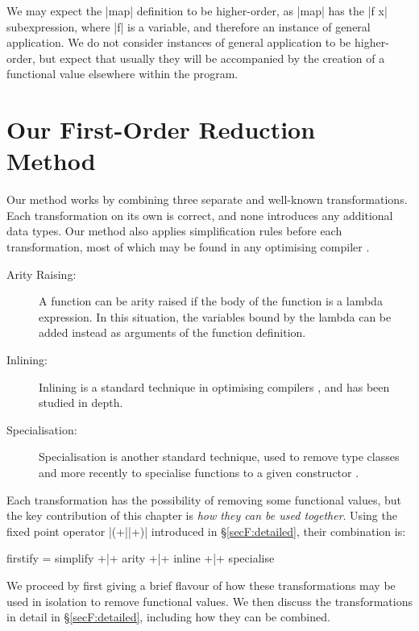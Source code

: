 We may expect the |map| definition to be higher-order, as |map| has the |f x| subexpression, where |f| is a variable, and therefore an instance of general application. We do not consider instances of general application to be higher-order, but expect that usually they will be accompanied by the creation of a functional value elsewhere within the program.

\section{Our First-Order Reduction Method}
\label{secF:overview}

Our method works by combining three separate and well-known transformations. Each transformation on its own is correct, and none introduces any additional data types. Our method also applies simplification rules before each transformation, most of which may be found in any optimising compiler \cite{spj:transformation}.

\begin{description}
\item[Arity Raising:] A function can be arity raised if the body of the function is a lambda expression. In this situation, the variables bound by the lambda can be added instead as arguments of the function definition.
\item[Inlining:] Inlining is a standard technique in optimising compilers \cite{spj:inlining}, and has been studied in depth.
\item[Specialisation:] Specialisation is another standard technique, used to remove type classes \cite{jones:dictionary_free} and more recently to specialise functions to a given constructor \cite{spj:specconstr}.
\end{description}

Each transformation has the possibility of removing some functional values, but the key contribution of this chapter is \textit{how they can be used together}. Using the fixed point operator |(+||+)| introduced in \S\ref{secF:detailed}, their combination is:

\begin{code}
firstify = simplify +|+ arity +|+ inline +|+ specialise
\end{code}

We proceed by first giving a brief flavour of how these transformations may be used in isolation to remove functional values. We then discuss the transformations in detail in \S\ref{secF:detailed}, including how they can be combined.

